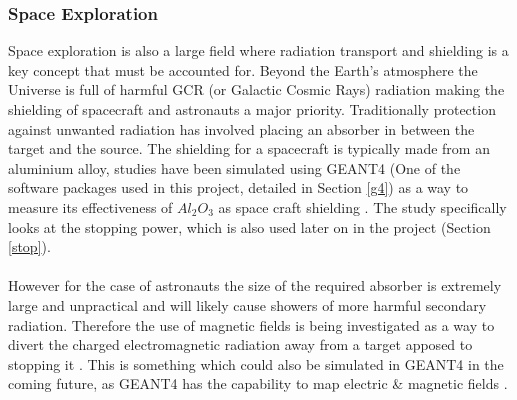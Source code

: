 \documentclass[12pt,a4paper]{article}
\begin{document}
\subsubsection{Space Exploration}
\noindent Space exploration is also a large field where radiation transport and shielding is a key concept that must be accounted for. Beyond the Earth's atmosphere the Universe is full of harmful GCR (or Galactic Cosmic Rays) radiation making the shielding of spacecraft and astronauts a major priority. Traditionally protection against unwanted radiation has involved placing an absorber in between the target and the source. The shielding for a spacecraft is typically made from an aluminium alloy, studies have been simulated using GEANT4 (One of the software packages used in this project, detailed in Section \ref{g4}) as a way to measure its effectiveness of $Al_2O_3$ as space craft shielding \cite{spacesh}. The study specifically looks at the stopping power, which is also used later on in the project (Section \ref{stop}). 
\\\\
\noindent However for the case of astronauts the size of the required absorber is extremely large and unpractical and will likely cause showers of more harmful secondary radiation. Therefore the use of magnetic fields is being investigated as a way to divert the charged electromagnetic radiation away from a target apposed to stopping it \cite{magf}. This is something which could also be simulated in GEANT4 in the coming future, as GEANT4 has the capability to map electric \& magnetic fields \cite{bdsimpap}.
\end{document}
